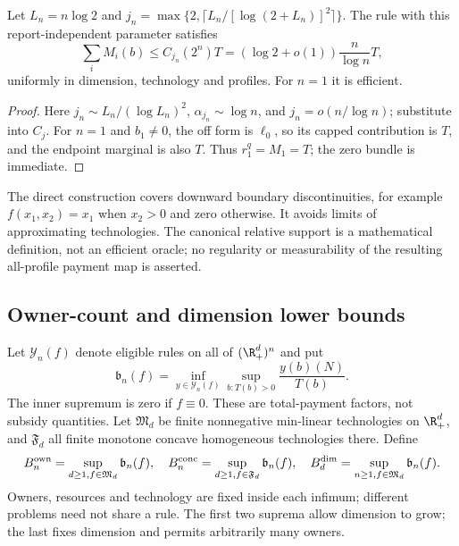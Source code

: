 \begin{corollary}\label{ext:cor:owner-upper}
Let $L_n=n\log2$ and $j_n=\max\{2,\lceil L_n/[\log(2+L_n)]^2\rceil\}$.
The rule with this report-independent parameter satisfies
\[
 \sum_iM_i(b)\le C_{j_n}(2^n)T
   =(\log2+o(1))\frac n{\log n}T,
\]
uniformly in dimension, technology and profiles.  For $n=1$ it is efficient.
\end{corollary}
\begin{proof}
Here $j_n\sim L_n/(\log L_n)^2$, $\alpha_{j_n}\sim\log n$, and
$j_n=o(n/\log n)$; substitute into $C_j$.
For $n=1$ and $b_1\ne0$, the off form is $\ell_0$, so its capped
contribution is $T$, and the endpoint marginal is also $T$.
Thus $r_1^q=M_1=T$; the zero bundle is immediate.
\end{proof}
\begin{remark}\label{ext:rem:direct}
The direct construction covers downward boundary discontinuities, for example
$f(x_1,x_2)=x_1$ when $x_2>0$ and zero otherwise.
It avoids limits of approximating technologies.  The canonical relative
support is a mathematical definition, not an efficient oracle; no regularity
or measurability of the resulting all-profile payment map is asserted.
\end{remark}

\subsection{Owner-count and dimension lower bounds}
\begin{definition}\label{ext:def:factors}
Let $\mathcal Y_n(f)$ denote eligible rules on all of $(\R_+^d)^n$ and put
\[
 \mathfrak b_n(f)=\inf_{y\in\mathcal Y_n(f)}\sup_{b:T(b)>0}\frac{y(b)(N)}{T(b)}.
\]
The inner supremum is zero if $f\equiv0$.  These are total-payment factors,
not subsidy quantities.  Let $\mathfrak M_d$ be finite nonnegative min-linear
technologies on $\R_+^d$, and $\mathfrak F_d$ all finite monotone concave
homogeneous technologies there.  Define
\[
 B_n^{\rm own}=\sup_{d\ge1,f\in\mathfrak M_d}\mathfrak b_n(f),\quad
 B_n^{\rm conc}=\sup_{d\ge1,f\in\mathfrak F_d}\mathfrak b_n(f),\quad
 B_d^{\rm dim}=\sup_{n\ge1,f\in\mathfrak M_d}\mathfrak b_n(f).
\]
Owners, resources and technology are fixed inside each infimum; different
problems need not share a rule.  The first two suprema allow dimension to
grow; the last fixes dimension and permits arbitrarily many owners.
\end{definition}

